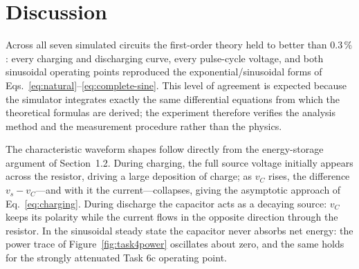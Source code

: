 \documentclass[12pt,a4paper]{article}
\begin{document}
	\section{Discussion}
	\label{sec:discussion}
	Across all seven simulated circuits the first-order theory held to
	better than $0.3\,\%$: every charging and discharging curve, every
	pulse-cycle voltage, and both sinusoidal operating points reproduced
	the exponential/sinusoidal forms of
	Eqs.~\eqref{eq:natural}--\eqref{eq:complete-sine}.  This level of
	agreement is expected because the simulator integrates exactly the
	same differential equations from which the theoretical formulas are
	derived; the experiment therefore verifies the analysis method and
	the measurement procedure rather than the physics.
	
	The characteristic waveform shapes follow directly from the
	energy-storage argument of Section~1.2.  During charging, the full
	source voltage initially appears across the resistor, driving a
	large deposition of charge; as $v_C$ rises, the difference
	$v_s - v_C$---and with it the current---collapses, giving the
	asymptotic approach of Eq.~\eqref{eq:charging}.  During discharge
	the capacitor acts as a decaying source: $v_C$ keeps its polarity
	while the current flows in the opposite direction through the
	resistor.  In the sinusoidal steady state the capacitor never
	absorbs net energy: the power trace of Figure~\ref{fig:task4power}
	oscillates about zero, and the same holds for the strongly
	attenuated Task 6c operating point.
	
\end{document}
